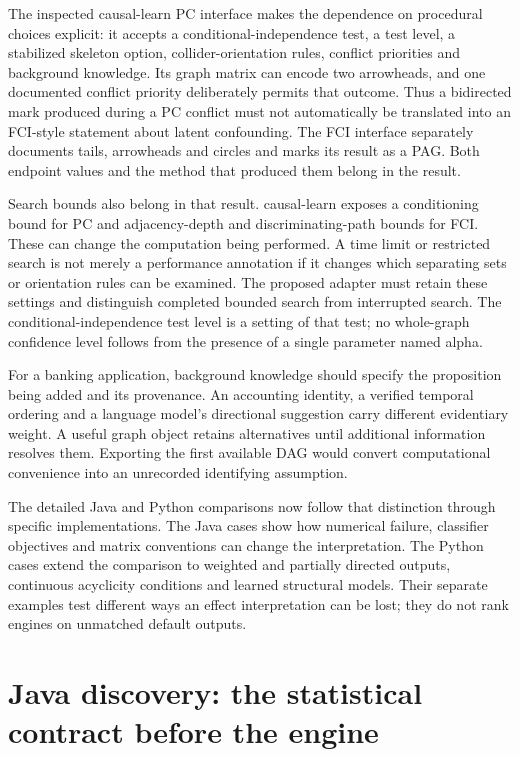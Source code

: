 The inspected causal-learn PC interface makes the dependence on procedural
choices explicit: it accepts a conditional-independence test, a test level,
a stabilized skeleton option, collider-orientation rules, conflict priorities
and background knowledge. Its graph matrix can encode two arrowheads, and
one documented conflict priority deliberately permits that outcome. Thus a
bidirected mark produced during a PC conflict must not automatically be
translated into an FCI-style statement about latent confounding. The FCI
interface separately documents tails, arrowheads and circles and marks its
result as a PAG. Both endpoint values and the method that produced them
belong in the result. \cite{v12_sw_causallearn}

Search bounds also belong in that result. causal-learn exposes a conditioning
bound for PC and adjacency-depth and discriminating-path bounds for FCI. These
can change the computation being performed. A time limit or restricted search
is not merely a performance annotation if it changes which separating sets or
orientation rules can be examined. The proposed adapter must retain these
settings and distinguish completed bounded search from interrupted search.
The conditional-independence test level is a setting of that test; no whole-graph
confidence level follows from the presence of a single parameter named alpha.

For a banking application, background knowledge should specify the proposition
being added and its provenance. An accounting identity, a verified temporal
ordering and a language model's directional suggestion carry different
evidentiary weight. A useful graph object retains alternatives until additional
information resolves them. Exporting the first available DAG would convert
computational convenience into an unrecorded identifying assumption.

The detailed Java and Python comparisons now follow that distinction through
specific implementations. The Java cases show how numerical failure,
classifier objectives and matrix conventions can change the interpretation.
The Python cases extend the comparison to weighted and partially directed
outputs, continuous acyclicity conditions and learned structural models.
Their separate examples test different ways an effect interpretation can be
lost; they do not rank engines on unmatched default outputs.



\hypertarget{java-discovery-the-statistical-contract-before-the-engine}{%
\section{Java discovery: the statistical contract before the
engine}\label{java-discovery-the-statistical-contract-before-the-engine}}

